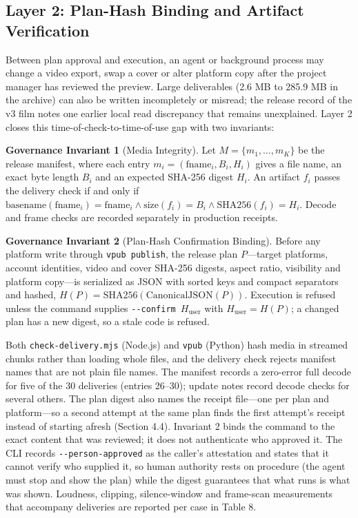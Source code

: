 \documentclass[11pt,a4paper]{article}
\theoremstyle{definition}
\newtheorem{invariant}{Governance Invariant}
\begin{document}
\subsection{Layer 2: Plan-Hash Binding and Artifact Verification}
\label{sec:4.3}

Between plan approval and execution, an agent or background process may change a video export, swap a cover or alter platform copy after the project manager has reviewed the preview. Large deliverables (2.6 MB to 285.9 MB in the archive) can also be written incompletely or misread; the release record of the v3 film notes one earlier local read discrepancy that remains unexplained. Layer 2 closes this time-of-check-to-time-of-use gap with two invariants:

\begin{invariant}[Media Integrity]
Let $M = \{m_1, \dots, m_K\}$ be the release manifest, where each entry $m_i = (\text{fname}_i, B_i, H_i)$ gives a file name, an exact byte length $B_i$ and an expected SHA-256 digest $H_i$. An artifact $f_i$ passes the delivery check if and only if $\text{basename}(\text{fname}_i) = \text{fname}_i \land \text{size}(f_i) = B_i \land \text{SHA256}(f_i) = H_i$. Decode and frame checks are recorded separately in production receipts.
\end{invariant}

\begin{invariant}[Plan-Hash Confirmation Binding]
Before any platform write through \texttt{vpub publish}, the release plan $P$---target platforms, account identities, video and cover SHA-256 digests, aspect ratio, visibility and platform copy---is serialized as JSON with sorted keys and compact separators and hashed, $H(P) = \text{SHA256}(\text{CanonicalJSON}(P))$. Execution is refused unless the command supplies \texttt{-{}-confirm}~$H_{\text{user}}$ with $H_{\text{user}} = H(P)$; a changed plan has a new digest, so a stale code is refused.
\end{invariant}

Both \texttt{check-\allowbreak{}delivery.\allowbreak{}mjs} (Node.js) and \texttt{vpub} (Python) hash media in streamed chunks rather than loading whole files, and the delivery check rejects manifest names that are not plain file names. The manifest records a zero-error full decode for five of the 30 deliveries (entries 26--30); update notes record decode checks for several others. The plan digest also names the receipt file---one per plan and platform---so a second attempt at the same plan finds the first attempt's receipt instead of starting afresh (Section 4.4). Invariant 2 binds the command to the exact content that was reviewed; it does not authenticate who approved it. The CLI records \texttt{-\allowbreak{}{}-\allowbreak{}person-\allowbreak{}approved} as the caller's attestation and states that it cannot verify who supplied it, so human authority rests on procedure (the agent must stop and show the plan) while the digest guarantees that what runs is what was shown. Loudness, clipping, silence-window and frame-scan measurements that accompany deliveries are reported per case in Table 8.
\end{document}
